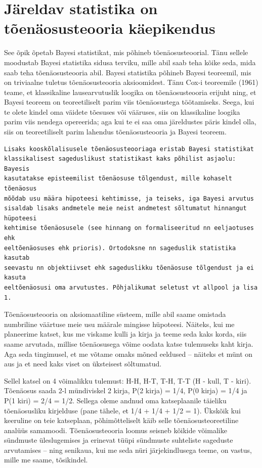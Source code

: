 \documentclass[]{book}
\begin{document}
\hypertarget{jareldav-statistika-on-toenaosusteooria-kaepikendus}{%
\section*{Järeldav statistika on tõenäosusteooria käepikendus}\label{jareldav-statistika-on-toenaosusteooria-kaepikendus}}

See õpik õpetab Bayesi statistikat, mis põhineb tõenäosusteoorial. Tänu sellele moodustab Bayesi statistika sidusa terviku, mille abil saab teha kõike seda, mida saab teha tõenäosusteooria abil. Bayesi statistika põhineb Bayesi teoreemil, mis on triviaalne tuletus tõenäosusteooria aksioomidest. Tänu Cox-i teoreemile (1961) teame, et klassikaline lausearvutuslik loogika on tõenäosusteooria erijuht ning, et Bayesi teoreem on teoreetiliselt parim viis tõenäosustega töötamiseks. Seega, kui te olete kindel oma väidete tõesuses või vääruses, siis on klassikaline loogika parim viis nendega opereerida; aga kui te ei saa oma järeldustes päris kindel olla, siis on teoreetiliselt parim lahendus tõenäosusteooria ja Bayesi teoreem.

\begin{verbatim}
Lisaks kooskõlalisusele tõenäosusteooriaga eristab Bayesi statistikat 
klassikalisest sageduslikust statistikast kaks põhilist asjaolu: Bayesis 
kasutatakse episteemilist tõenäosuse tõlgendust, mille kohaselt tõenäosus 
mõõdab usu määra hüpoteesi kehtimisse, ja teiseks, iga Bayesi arvutus 
sisaldab lisaks andmetele meie neist andmetest sõltumatut hinnangut hüpoteesi
kehtimise tõenäosusele (see hinnang on formaliseeritud nn eeljaotuses ehk
eeltõenäosuses ehk prioris). Ortodoksne nn sageduslik statistika kasutab 
seevastu nn objektiivset ehk sageduslikku tõenäosuse tõlgendust ja ei kasuta
eeltõenäosusi oma arvutustes. Põhjalikumat seletust vt allpool ja lisa 1.
\end{verbatim}

Tõenäosusteooria on aksiomaatiline süsteem, mille abil saame omistada numbriline väärtuse meie usu määrale mingisse hüpoteesi. Näiteks, kui me planeerime katset, kus me viskame kulli ja kirja ja teeme seda kaks korda, siis saame arvutada, millise tõenäosusega võime oodata katse tulemuseks kaht kirja. Aga seda tingimusel, et me võtame omaks mõned eeldused -- näiteks et münt on aus ja et need kaks viset on üksteisest sõltumatud.

Sellel katsel on 4 võimalikku tulemust: H-H, H-T, T-H, T-T (H - kull, T - kiri). Tõenäosus saada 2-l mündiviskel 2 kirja, P(2 kirja) = 1/4, P(0 kirja) = 1/4 ja P(1 kiri) = 2/4 = 1/2. Sellega oleme andnud oma katseplaanile täieliku tõenäosusliku kirjelduse (pane tähele, et 1/4 + 1/4 + 1/2 = 1). Ükskõik kui keeruline on teie katseplaan, põhimõtteliselt käib selle tõenäosusteoreetiline analüüs samamoodi.
Tõenäosusteooria loomus seisneb kõikide võimalike sündmuste üleslugemises ja erinevat tüüpi sündmuste suhteliste sageduste arvutamises -- ning senikaua, kui me seda nüri järjekindlusega teeme, on vastus, mille me saame, tõsikindel.
\end{document}
